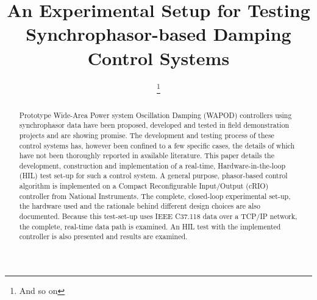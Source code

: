 \documentclass[conference]{IEEEtran}
\begin{document}
\title{An Experimental Setup for Testing Synchrophasor-based Damping Control Systems}


\author{
\thanks{And so on}
\and

\and
{}
}

\maketitle
\begin{abstract}
Prototype Wide-Area Power system Oscillation Damping (WAPOD) controllers using synchrophasor data have been proposed, developed and tested in field demonstration projects and are showing promise. The development and testing process of these control systems has, however been confined to a few specific cases, the details of which have not been thoroughly reported in available literature. This paper details the development, construction and implementation of a real-time, Hardware-in-the-loop (HIL) test set-up for such a control system. A general purpose, phasor-based control algorithm is implemented on a Compact Reconfigurable Input/Output (cRIO) controller from National Instruments. The complete, closed-loop experimental set-up, the hardware used and the rationale behind different design choices are also documented. Because this test-set-up uses IEEE C37.118 data over a TCP/IP network, the complete, real-time data path is examined. An HIL test with the implemented controller is also presented and results are examined.

\end{abstract}

\end{document}
